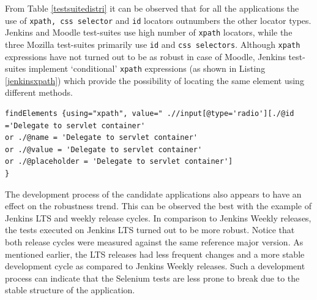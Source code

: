 From Table \ref{testsuitedistri} it can be observed that for all the applications the use of \texttt{xpath, css selector} and \texttt{id} locators outnumbers the other locator types. Jenkins and Moodle test-suites use high number of \texttt{xpath} locators, while the three Mozilla test-suites primarily use \texttt{id} and \texttt{css selectors}. Although \texttt{xpath} expressions have not turned out to be as robust in case of Moodle, Jenkins test-suites implement `conditional' \texttt{xpath} expressions (as shown in Listing \ref{jenkinsxpath}) which provide the possibility of locating the same element using different methods. 

\begin{center}
\begin{scriptsize}
\centering
\lstset{
  basicstyle=\ttfamily,
  columns=fullflexible,
  keepspaces=true,
}
  
\begin{lstlisting}[caption=Jenkins conditional \texttt{xpath} expression,label=jenkinsxpath]
findElements {using="xpath", value=" .//input[@type='radio'][./@id ='Delegate to servlet container' 
or ./@name = 'Delegate to servlet container' 
or ./@value = 'Delegate to servlet container' 
or ./@placeholder = 'Delegate to servlet container']
}
\end{lstlisting}
\end{scriptsize} 
\end{center}


The development process of the candidate applications also appears to have an effect on the robustness trend. This can be observed the best with the example of Jenkins LTS and weekly release cycles. In comparison to Jenkins Weekly releases, the tests executed on Jenkins LTS turned out to be more robust. Notice that both release cycles were measured against the same reference major version. As mentioned earlier, the LTS releases had less frequent changes and a more stable development cycle as compared to Jenkins Weekly releases. Such a development process can indicate that the Selenium tests are less prone to break due to the stable structure of the application. 

